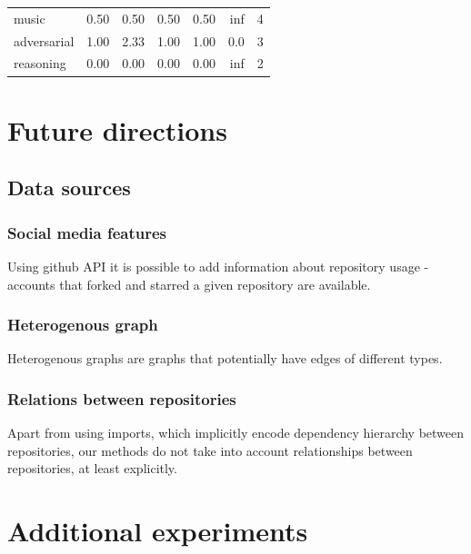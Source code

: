 \documentclass[11pt]{report}
\begin{document}
{\begin{center}
\begin{tabular}{p{1cm}rrrrrr}
music                       &     0.50 &         0.50 &          0.50 &              0.50 &                    inf &     4 \\
adversarial                 &     1.00 &         2.33 &          1.00 &              1.00 &                    0.0 &     3 \\
reasoning                   &     0.00 &         0.00 &          0.00 &              0.00 &                    inf &     2 \\
\bottomrule
\end{tabular}
\end{center}
}

\chapter{Future directions}

\section{Data sources}

\subsection{Social media features}

Using github API it is possible to add information about repository usage -
accounts that forked and starred a given repository are available.

\subsection{Heterogenous graph}

Heterogenous graphs are graphs that potentially have edges of different types\cite{hetero_graphs}.


\subsection{Relations between repositories}

Apart from using imports, which implicitly encode dependency hierarchy between
repositories, our methods do not take into account relationships between
repositories, at least explicitly. 

\nocite{*}



\appendix

\chapter{Additional experiments}
\end{document}
